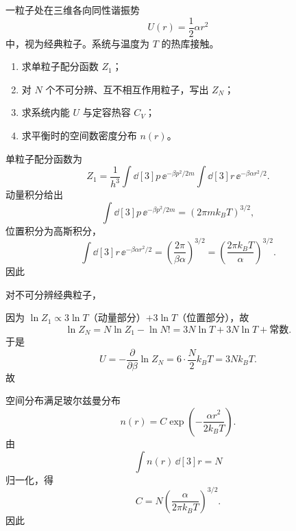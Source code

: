 \begin{question}
一粒子处在三维各向同性谐振势
\[
U(r)=\frac12 \alpha r^2
\]
中，视为经典粒子。系统与温度为 $T$ 的热库接触。

\begin{enumerate}[label=(\arabic*),leftmargin=2.5em]
  \item 求单粒子配分函数 $Z_1$；
  \item 对 $N$ 个不可分辨、互不相互作用粒子，写出 $Z_N$；
  \item 求系统内能 $U$ 与定容热容 $C_V$；
  \item 求平衡时的空间数密度分布 $n(r)$。
\end{enumerate}

\begin{solution}
单粒子配分函数为
\[
Z_1=\frac{1}{h^3}\int \dd[3]{p}\,\ee^{-\beta p^2/2m}\int \dd[3]{r}\,\ee^{-\beta \alpha r^2/2}.
\]
动量积分给出
\[
\int \dd[3]{p}\,\ee^{-\beta p^2/2m}=(2\pi m k_B T)^{3/2},
\]
位置积分为高斯积分，
\[
\int \dd[3]{r}\,\ee^{-\beta \alpha r^2/2}
=\left(\frac{2\pi}{\beta\alpha}\right)^{3/2}
=\left(\frac{2\pi k_B T}{\alpha}\right)^{3/2}.
\]
因此

对不可分辨经典粒子，

因为 $\ln Z_1 \propto 3\ln T$（动量部分）$+3\ln T$（位置部分），故
\[
\ln Z_N = N\ln Z_1-\ln N! = 3N\ln T + 3N\ln T + \text{常数}.
\]
于是
\[
U=-\frac{\partial}{\partial\beta}\ln Z_N = 6\cdot \frac{N}{2}k_B T = 3Nk_B T.
\]
故

空间分布满足玻尔兹曼分布
\[
n(r)=C\exp\!\left(-\frac{\alpha r^2}{2k_B T}\right).
\]
由
\[
\int n(r)\,\dd[3]{r}=N
\]
归一化，得
\[
C=N\left(\frac{\alpha}{2\pi k_B T}\right)^{3/2}.
\]
因此
\end{solution}
\end{question}
